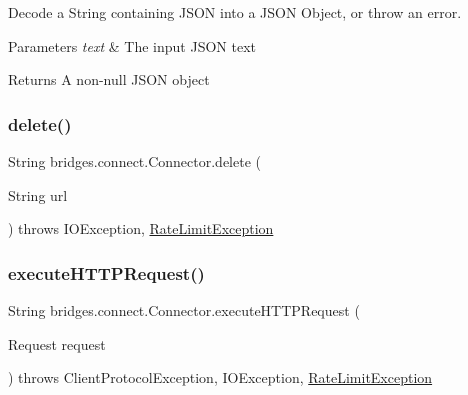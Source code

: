 Decode a String containing J\+S\+ON into a J\+S\+ON Object, or throw an error. 
\begin{DoxyParams}{Parameters}
{\em text} & The input J\+S\+ON text \\
\hline
\end{DoxyParams}
\begin{DoxyReturn}{Returns}
A non-\/null J\+S\+ON object 
\end{DoxyReturn}
\mbox{\label{classbridges_1_1connect_1_1_connector_ac0a6f796f1ebcf312b89a7d233c8ac91}} 
\subsubsection{\texorpdfstring{delete()}{delete()}}
{\footnotesize\ttfamily String bridges.\+connect.\+Connector.\+delete (\begin{DoxyParamCaption}\item[{String}]{url }\end{DoxyParamCaption}) throws I\+O\+Exception, \hyperlink{classbridges_1_1validation_1_1_rate_limit_exception}{Rate\+Limit\+Exception}}

\mbox{\label{classbridges_1_1connect_1_1_connector_aabcfde23d155c8c42edb8a1407320bc5}} 
\subsubsection{\texorpdfstring{execute\+H\+T\+T\+P\+Request()}{executeHTTPRequest()}}
{\footnotesize\ttfamily String bridges.\+connect.\+Connector.\+execute\+H\+T\+T\+P\+Request (\begin{DoxyParamCaption}\item[{Request}]{request }\end{DoxyParamCaption}) throws Client\+Protocol\+Exception, I\+O\+Exception, \hyperlink{classbridges_1_1validation_1_1_rate_limit_exception}{Rate\+Limit\+Exception}}

